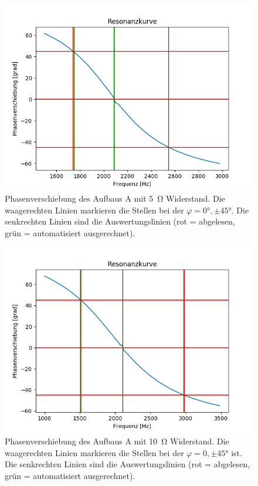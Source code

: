 \documentclass[12pt,a4paper]{article}
\begin{document}
\begin{figure}
	\centering
	\includegraphics[scale=0.8]{Bilder/Serie_Phasenverschiebung_A_5.png}
	\caption{Phasenverschiebung des Aufbaus A mit \SI{5}{\ohm} Widerstand. Die waagerechten Linien markieren die Stellen bei der $\varphi = \ang{0}, \pm \ang{45}$. Die senkrechten Linien sind die Auswertungslinien (rot = abgelesen, grün = automatisiert ausgerechnet).}
	\label{fig:Serie_Phasenverschiebung_A_5}
\end{figure}
\begin{figure}
	\centering
	\includegraphics[scale=0.8]{Bilder/Serie_Phasenverschiebung_A_10.png}
	\caption{Phasenverschiebung des Aufbaus A mit \SI{10}{\ohm} Widerstand. Die waagerechten Linien markieren die Stellen bei der $\varphi = 0, \pm \ang{45}$ ist. Die senkrechten Linien sind die Auswertungslinien (rot = abgelesen, grün = automatisiert ausgerechnet).}
	\label{fig:Serie_Phasenverschiebung_A_10}
\end{figure}
\end{document}
